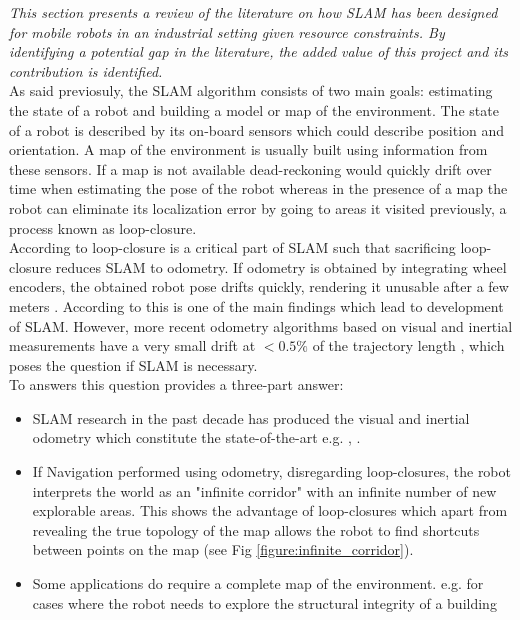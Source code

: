 \label{section:litreview_slam}

\textit{This section presents a review of the literature on how SLAM has been designed for mobile robots in an industrial setting given resource constraints. By identifying a potential gap in the literature, the added value of this project and its contribution is identified. }\\

As said previosuly, the SLAM algorithm consists of two main goals: estimating the state of a robot and building a model or map of the environment. The state of a robot is described by its on-board sensors which could describe position and orientation. A map of the environment is usually built using information from these sensors. If a map is not available dead-reckoning would quickly drift over time when estimating the pose of the robot whereas in the presence of a map the robot can eliminate its localization error by going to areas it visited previously, a process known as loop-closure.\\


\noindent According to \cite{cadena2016past} loop-closure is a critical part of SLAM such that sacrificing loop-closure reduces SLAM to odometry. If odometry is obtained by integrating wheel encoders, the obtained robot pose drifts quickly, rendering it unusable after a few meters \cite[Chapter~6]{kelly2013mobile}. According to \cite{newman2002explore} this is one of the main findings which lead to development of SLAM. However, more recent odometry algorithms based on visual and inertial measurements have a very small drift at $<0.5\%$ of the trajectory length \cite{forster2016manifold}, which poses the question if SLAM is necessary.\\

To answers this question \cite{cadena2016past} provides a three-part answer:
\begin{itemize}
    \item SLAM research in the past decade has produced the visual and inertial odometry which constitute the state-of-the-art e.g. \cite{lynen2015get}, \cite{mourikis2007multi}.
    \item If Navigation performed using odometry, disregarding loop-closures, the robot interprets the world as an "infinite corridor" with an infinite number of new explorable areas. This shows the advantage of loop-closures which apart from revealing the true topology of the map allows the robot to find shortcuts between points on the map (see Fig \ref{figure:infinite_corridor}).

    \item Some applications do require a complete map of the environment. e.g. for cases where the robot needs to explore the structural integrity of a building 

\end{itemize}

